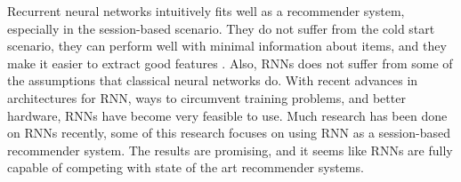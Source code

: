 
Recurrent neural networks intuitively fits well as a recommender system, especially in the session-based scenario. They do not suffer from the cold start scenario, they can perform well with minimal information about items, and they make it easier to extract good features \cite{ZALANDO:understanding-consumer-histories}. Also, RNNs does not suffer from some of the assumptions that classical neural networks do. With recent advances in architectures for RNN, ways to circumvent training problems, and better hardware, RNNs have become very feasible to use. Much research has been done on RNNs recently, some of this research focuses on using RNN as a session-based recommender system. The results are promising, and it seems like RNNs are fully capable of competing with state of the art recommender systems.






